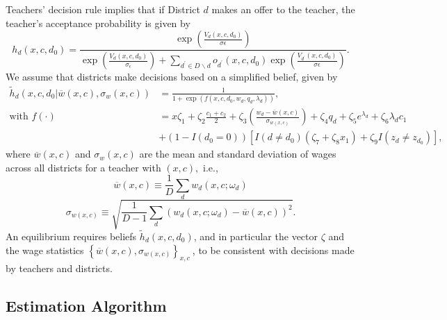 \documentclass[notitlepage,12pt]{article}%
\begin{document}
Teachers' decision rule implies that if District $d$ makes an offer to the
teacher, the teacher's acceptance probability is given by
\begin{equation}
h_{d}\left(  x,c,d_{0}\right)  =\frac{\exp\left(  \frac{V_{d}\left(
x,c,d_{0}\right)  }{\sigma\epsilon}\right)  }{\exp\left(  \frac{V_{d}\left(
x,c,d_{0}\right)  }{\sigma_{\epsilon}}\right)  +\sum_{d^{\prime}\in
D\backslash d}o_{d^{\prime}}\left(  x,c,d_{0}\right)  \exp\left(
\frac{V_{d^{\prime}}\left(  x,c,d_{0}\right)  }{\sigma\epsilon}\right)  }.
\label{hh}%
\end{equation}
We assume that districts make decisions based on a simplified belief, given
by
\begin{align}
\widetilde{h}_{d}\left(  x,c,d_{0}|\overline{w}\left(  x,c\right)  ,\sigma
_{w}\left(  x,c\right)  \right)   &  =\frac{1}{1+\exp\left(  f\left(
x,c,d_{0},w_{d},q_{d},\lambda_{d}\right)  \right)  },\label{bb}\\
\text{with }f\left(  \cdot\right)   &  =x\zeta_{1}+\zeta_{2}\frac{c_{1}+c_{2}%
}{2}+\zeta_{3}\left(  \frac{w_{d}-\overline{w}\left(  x,c\right)  }%
{\sigma_{w\left(  x,c\right)  }}\right)  +\zeta_{4}q_{d}+\zeta_{5}%
e^{\lambda_{d}}+\zeta_{6}\lambda_{d}c_{1}\nonumber\\
&  +\left(  1-I\left(  d_{0}=0\right)  \right)  \left[  I\left(  d\neq
d_{0}\right)  \left(  \zeta_{7}+\zeta_{8}x_{1}\right)  +\zeta_{9}I\left(
z_{d}\neq z_{d_{0}}\right)  \right]  ,\nonumber
\end{align}
where $\overline{w}\left(  x,c\right)  $ and $\sigma_{w}\left(  x,c\right)  $
are the mean and standard deviation of wages across all districts for a
teacher with $\left(  x,c\right)  ,$ i.e.,
\begin{equation}
\overline{w}\left(  x,c\right)  \equiv\frac{1}{D}\sum_{d}w_{d}\left(
x,c;\omega_{d}\right)  \label{mw}%
\end{equation}%
\begin{equation}
\sigma_{w\left(  x,c\right)  }\equiv\sqrt{\frac{1}{D-1}\sum_{d}\left(
w_{d}\left(  x,c;\omega_{d}\right)  -\overline{w}\left(  x,c\right)  \right)
^{2}}. \label{std}%
\end{equation}
An equilibrium requires beliefs $\widetilde{h}_{d}\left(  x,c,d_{0}\right)  $,
and in particular the vector $\zeta$ and the wage statistics $\left\{
\overline{w}\left(  x,c\right)  ,\sigma_{w\left(  x,c\right)  }\right\}
_{x,c}\ $, to be consistent with decisions made by teachers and districts.

\subsection{Estimation Algorithm}
\end{document}
